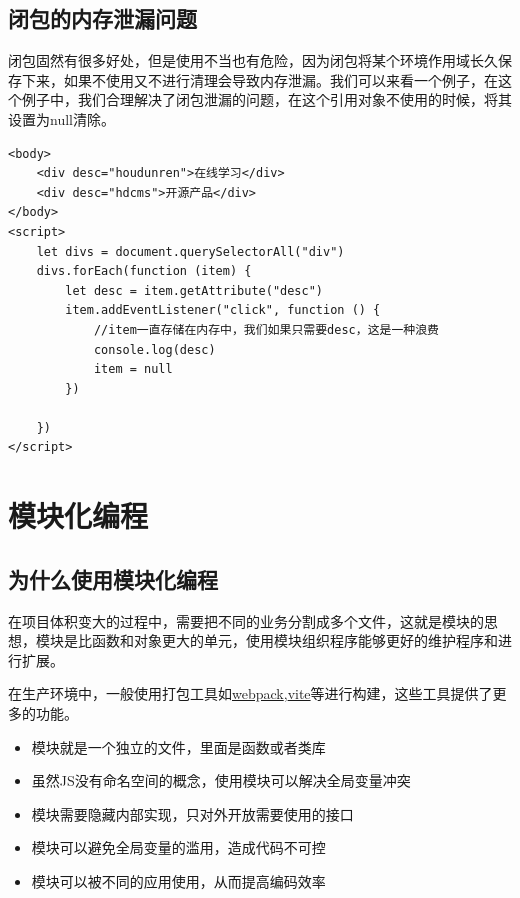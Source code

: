 \documentclass[
	11pt,
	fleqn,
	a4paper,
]{LegrandOrangeBook}
\begin{document}
\section{闭包的内存泄漏问题}
闭包固然有很多好处，但是使用不当也有危险，因为闭包将某个环境作用域长久保存下来，如果不使用又不进行清理会导致内存泄漏。我们可以来看一个例子，在这个例子中，我们合理解决了闭包泄漏的问题，在这个引用对象不使用的时候，将其设置为null清除。
\begin{verbatim}
<body>
    <div desc="houdunren">在线学习</div>
    <div desc="hdcms">开源产品</div>
</body>
<script>
    let divs = document.querySelectorAll("div")
    divs.forEach(function (item) {
        let desc = item.getAttribute("desc")
        item.addEventListener("click", function () {
            //item一直存储在内存中，我们如果只需要desc，这是一种浪费
            console.log(desc)
            item = null
        })

    })
</script>
\end{verbatim}
\chapter{模块化编程}
\section{为什么使用模块化编程}
在项目体积变大的过程中，需要把不同的业务分割成多个文件，这就是模块的思想，模块是比函数和对象更大的单元，使用模块组织程序能够更好的维护程序和进行扩展。

在生产环境中，一般使用打包工具如\underline{webpack},\underline{vite}等进行构建，这些工具提供了更多的功能。
\begin{itemize}
    \item 模块就是一个独立的文件，里面是函数或者类库
    \item 虽然JS没有命名空间的概念，使用模块可以解决全局变量冲突
    \item 模块需要隐藏内部实现，只对外开放需要使用的接口
    \item 模块可以避免全局变量的滥用，造成代码不可控
    \item 模块可以被不同的应用使用，从而提高编码效率
\end{itemize}
\end{document}

